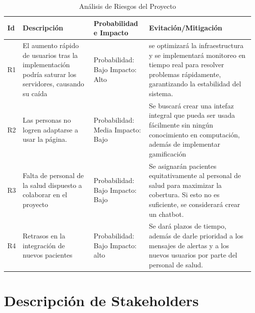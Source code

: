 \documentclass{article}
\begin{document}
	\begin{table}[H]
	\centering
	\caption{Análisis de Riesgos del Proyecto}
	\begin{tabular}{@{} p{1cm} p{5.5cm} p{3cm} p{5.5cm} @{}}
		\toprule
		\textbf{Id} & \textbf{Descripción} & \textbf{Probabilidad e Impacto} & \textbf{Evitación/Mitigación} \\
		\midrule
		
		R1 & 
		El aumento rápido de usuarios tras la implementación podría saturar los servidores, causando su caída & 
		Probabilidad: Bajo \newline Impacto: Alto & 
		se optimizará la infraestructura y se implementará monitoreo en tiempo real para resolver problemas rápidamente, garantizando la estabilidad del sistema. \\
		
		\addlinespace
		
		R2 & 
		Las personas no logren adaptarse a usar la página. & 
		Probabilidad: Media \newline Impacto: Bajo & 
		Se buscará crear una intefaz integral que pueda ser usada fácilmente sin ningún conocimiento en computación, además de implementar gamificación \\
		
		\addlinespace
		
		R3 & 
		Falta de personal de la salud dispuesto a colaborar en el proyecto & 
		Probabilidad: Bajo \newline Impacto: Bajo & 
		Se asignarán pacientes equitativamente al personal de salud para maximizar la cobertura. Si esto no es suficiente, se considerará crear un chatbot. \\
		
		\addlinespace
		
		R4 & 
		Retrasos en la integración de nuevos pacientes & 
		Probabilidad: Bajo \newline Impacto: alto & 
		Se dará plazos de tiempo, además de darle prioridad a los mensajes de alertas y a los nuevos usuarios por parte del personal de salud. \\
		
		\bottomrule
	\end{tabular}
	\end{table}
	
	
	
	
	
	\section{Descripción de Stakeholders}
	
\end{document}
